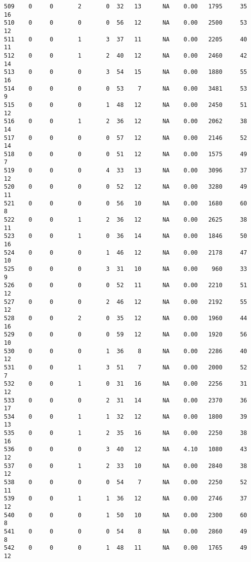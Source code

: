 \documentclass[
  letterpaper,
  DIV=11,
  numbers=noendperiod]{scrreprt}
\begin{document}
\begin{verbatim}
509    0     0       2       0  32   13      NA    0.00   1795     35      16
510    0     0       0       0  56   12      NA    0.00   2500     53      12
511    0     0       1       3  37   11      NA    0.00   2205     40      11
512    0     0       1       2  40   12      NA    0.00   2460     42      14
513    0     0       0       3  54   15      NA    0.00   1880     55      16
514    0     0       0       0  53    7      NA    0.00   3481     53       9
515    0     0       0       1  48   12      NA    0.00   2450     51      12
516    0     0       1       2  36   12      NA    0.00   2062     38      14
517    0     0       0       0  57   12      NA    0.00   2146     52      14
518    0     0       0       0  51   12      NA    0.00   1575     49       7
519    0     0       0       4  33   13      NA    0.00   3096     37      12
520    0     0       0       0  52   12      NA    0.00   3280     49      11
521    0     0       0       0  56   10      NA    0.00   1680     60       8
522    0     0       1       2  36   12      NA    0.00   2625     38      11
523    0     0       1       0  36   14      NA    0.00   1846     50      16
524    0     0       0       1  46   12      NA    0.00   2178     47      10
525    0     0       0       3  31   10      NA    0.00    960     33       9
526    0     0       0       0  52   11      NA    0.00   2210     51      12
527    0     0       0       2  46   12      NA    0.00   2192     55      12
528    0     0       2       0  35   12      NA    0.00   1960     44      16
529    0     0       0       0  59   12      NA    0.00   1920     56      10
530    0     0       0       1  36    8      NA    0.00   2286     40      12
531    0     0       1       3  51    7      NA    0.00   2000     52       7
532    0     0       1       0  31   16      NA    0.00   2256     31      12
533    0     0       0       2  31   14      NA    0.00   2370     36      17
534    0     0       1       1  32   12      NA    0.00   1800     39      13
535    0     0       1       2  35   16      NA    0.00   2250     38      16
536    0     0       0       3  40   12      NA    4.10   1080     43      12
537    0     0       1       2  33   10      NA    0.00   2840     38      12
538    0     0       0       0  54    7      NA    0.00   2250     52      11
539    0     0       1       1  36   12      NA    0.00   2746     37      12
540    0     0       0       1  50   10      NA    0.00   2300     60       8
541    0     0       0       0  54    8      NA    0.00   2860     49       8
542    0     0       0       1  48   11      NA    0.00   1765     49      12

\end{verbatim}
\end{document}
